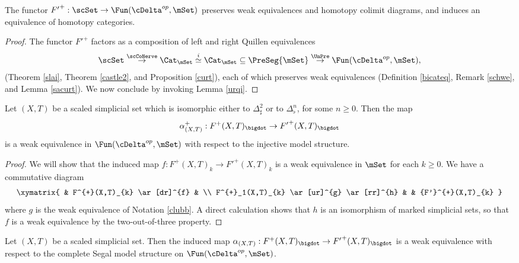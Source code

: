 \begin{lemma}\label{slappus}
The functor ${F'}^{+}: \scSet \rightarrow \Fun( \cDelta^{op}, \mSet)$ preserves weak equivalences
and homotopy colimit diagrams, and induces an equivalence of homotopy categories.
\end{lemma}

\begin{proof}
The functor ${F'}^{+}$ factors as a composition of left and right Quillen equivalences
$$ \scSet \stackrel{ \scCoNerve}{\rightarrow} \Cat_{\mSet} \stackrel{i}{\simeq}
\Cat_{\mSet}
\subseteq \PreSeg{\mSet} \stackrel{\UnPre}{\rightarrow} \Fun( \cDelta^{op}, \mSet),$$
(Theorem \ref{slai}, Theorem \ref{castle2}, and Proposition \ref{curt}),
each of which preserves weak equivalences (Definition \ref{bicateq}, 
Remark \ref{schwe}, and Lemma \ref{sacurt}). We now conclude by invoking Lemma \ref{urqi}.
\end{proof}

\begin{lemma}\label{jinker}
Let $(X,T)$ be a scaled simplicial set which is isomorphic either to $\Delta^2_{\sharp}$ or
to $\Delta^n_{\flat}$, for some $n \geq 0$. Then the map
$$ \alpha^{+}_{(X,T)}: F^{+}(X,T)_{\bigdot} \rightarrow {F'}^{+}(X,T)_{\bigdot}$$
is a weak equivalence in $\Fun( \cDelta^{op}, \mSet)$ with respect to the injective model structure.
\end{lemma}

\begin{proof}
We will show that the induced map $f: F^{+}(X,T)_{k} \rightarrow {F'}^{+}(X,T)_{k}$ is a weak equivalence in $\mSet$ for each $k \geq 0$. We have a commutative diagram
$$ \xymatrix{ & F^{+}(X,T)_{k} \ar[dr]^{f} & \\
F^{+}_1(X,T)_{k} \ar[ur]^{g} \ar[rr]^{h} & & {F'}^{+}(X,T)_{k} }$$
where $g$ is the weak equivalence of Notation \ref{clubb}. A direct calculation shows that
$h$ is an isomorphism of marked simplicial sets, so that $f$ is a weak equivalence by the two-out-of-three property.
\end{proof}

\begin{proposition}\label{kium}
Let $(X,T)$ be a scaled simplicial set. Then the induced map
$\alpha_{(X,T)}: F^{+}(X,T)_{\bigdot} \rightarrow {F'}^{+}(X,T)_{\bigdot}$ is a weak equivalence with
respect to the complete Segal model structure on $\Fun( \cDelta^{op}, \mSet)$.
\end{proposition}

